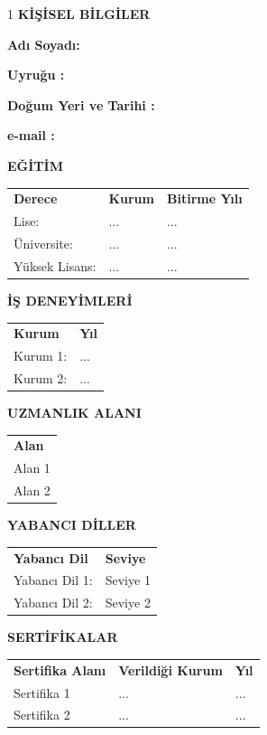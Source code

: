 \documentclass[12pt,oneside]{report}
\begin{document}
	\begin{ozgecmis}
		\begin{spacing}{1}
			\textbf{K\.I\c{S}\.ISEL B\.ILG\.ILER} 
			\bigskip \par
			\textbf{Ad{\i} Soyad\i :}  \par  
			\textbf{Uyru\u{g}u :}   \par
			\textbf{Do\u{g}um Yeri ve Tarihi :}  \par
			\textbf{e-mail :} 
			\bigskip \par
			\textbf{EĞ\.IT\.IM}
			\medskip \par
			\begin{tabular}{ p{5cm} p{5cm} p{5cm} }
				\textbf{Derece} & \textbf{Kurum} & \textbf{Bitirme Y\i l\i } \\
				Lise: & ... & ...\\
				Üniversite: & ... & ...\\
				Yüksek Lisans: & ... & ...
			\end{tabular}
			
			\bigskip \par
			\textbf{\.I\c{S} DENEY\.IMLER\.I}
			\medskip \par
			\begin{tabular}{ p{5cm} p{5cm} }
				\textbf{Kurum} & \textbf{Yıl}  \\
				Kurum 1: & ...\\
				Kurum 2: & ...
			\end{tabular}
		
			
			\bigskip \par
			\textbf{UZMANLIK ALANI} 
			\medskip \par
                \begin{tabular}{ p{5cm} }
				\textbf{Alan} \\
				Alan 1 \\
				Alan 2 
			\end{tabular}
			
			\bigskip \par
			\textbf{YABANCI D\.ILLER}
			\medskip \par
			\begin{tabular}{ p{5cm} p{5cm} }
				\textbf{Yabancı Dil} & \textbf{Seviye}  \\
				Yabancı Dil 1: & Seviye 1\\
				Yabancı Dil 2: & Seviye 2
			\end{tabular}
			
			\bigskip \par
			\textbf{SERTİFİKALAR}
			\medskip \par
                \begin{tabular}{ p{5cm} p{5cm} p{5cm} }
				\textbf{Sertifika Alanı} & \textbf{Verildiği Kurum} & \textbf{Yıl } \\
				Sertifika 1 & ... & ...\\
				Sertifika 2 & ... & ...
			\end{tabular}
			

\end{spacing}
\end{ozgecmis}
\end{document}
